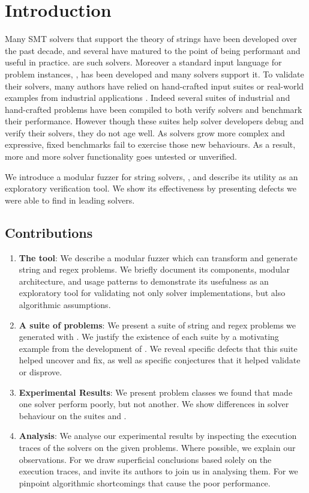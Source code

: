\section{Introduction}

    Many SMT solvers that support the theory of strings have been developed over the past decade, and several have matured to the point of being performant and useful in practice. \theSolvers{}\cite{cvc4}\cite{z3str3} are \numSolvers{} such solvers. Moreover a standard input language for problem instances, \smt{}\cite{smt}, has been developed and many solvers support it. To validate their solvers, many authors have relied on hand-crafted input suites or real-world examples from industrial applications \cite{cvc4-tests} \cite{z3str3-tests} \cite{z3str2-tests}. Indeed several suites of industrial and hand-crafted problems have been compiled \cite{kaluza} \cite{kausler} to both verify solvers and benchmark their performance. However though these suites help solver developers debug and verify their solvers, they do not age well. As solvers grow more complex and expressive, fixed benchmarks fail to exercise those new behaviours. As a result, more and more solver functionality goes untested or unverified.

    We introduce a modular fuzzer for string solvers, \fuzzer{}, and describe its utility as an exploratory verification tool. We show its effectiveness by presenting defects we were able to find in leading solvers.

    \subsection{Contributions}

    \begin{enumerate}
        \item \textbf{The \fuzzer{} tool}: We describe a modular fuzzer which can transform and generate \smt{} string and regex problems. We briefly document its components, modular architecture, and usage patterns to demonstrate its usefulness as an exploratory tool for validating not only solver implementations, but also algorithmic assumptions.
        \item \textbf{A suite of \smt{} problems}: We present a suite of \smt{} string and regex problems we generated with \fuzzer{}. We justify the existence of each suite by a motivating example from the development of \us{}. We reveal specific defects that this suite helped uncover and fix, as well as specific conjectures that it helped validate or disprove.
        \item \textbf{Experimental Results}: We present problem classes we found that made one solver perform poorly, but not another. We show differences in solver behaviour on the suites \cHard{} and \zHard{}.
        \item \textbf{Analysis}: We analyse our experimental results by inspecting the execution traces of the solvers on the given problems. Where possible, we explain our observations. For \cvc{} we draw superficial conclusions based solely on the execution traces, and invite its authors to join us in analysing them. For \us{} we pinpoint algorithmic shortcomings that cause the poor performance.
    \end{enumerate}
